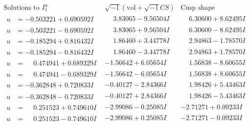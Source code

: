 \documentclass[1p]{elsarticle_modified}
\theoremstyle{definition}
\newcommand{\I}{\sqrt{-1}}
\begin{document}
$$\begin{array}{c|c|c}  
\text{Solutions to }I^u_{1}& \I (\text{vol} + \sqrt{-1}CS) & \text{Cusp shape}\\
 \hline 
\begin{aligned}
u &= -0.503221 + 0.690592 I\end{aligned}
 & \phantom{-}3.83065 - 9.56504 I & \phantom{-}6.30600 + 8.62495 I \\ \hline\begin{aligned}
u &= -0.503221 - 0.690592 I\end{aligned}
 & \phantom{-}3.83065 + 9.56504 I & \phantom{-}6.30600 - 8.62495 I \\ \hline\begin{aligned}
u &= -0.185294 + 0.816432 I\end{aligned}
 & \phantom{-}1.86460 + 3.44778 I & \phantom{-}2.94863 - 1.78570 I \\ \hline\begin{aligned}
u &= -0.185294 - 0.816432 I\end{aligned}
 & \phantom{-}1.86460 - 3.44778 I & \phantom{-}2.94863 + 1.78570 I \\ \hline\begin{aligned}
u &= \phantom{-}0.474941 + 0.689329 I\end{aligned}
 & -1.56642 + 6.05654 I & \phantom{-}1.56838 - 8.60655 I \\ \hline\begin{aligned}
u &= \phantom{-}0.474941 - 0.689329 I\end{aligned}
 & -1.56642 - 6.05654 I & \phantom{-}1.56838 + 8.60655 I \\ \hline\begin{aligned}
u &= -0.362848 + 0.720833 I\end{aligned}
 & -0.40127 - 2.84366 I & \phantom{-}1.98426 + 5.43463 I \\ \hline\begin{aligned}
u &= -0.362848 - 0.720833 I\end{aligned}
 & -0.40127 + 2.84366 I & \phantom{-}1.98426 - 5.43463 I \\ \hline\begin{aligned}
u &= \phantom{-}0.251523 + 0.749610 I\end{aligned}
 & -2.99086 - 0.25085 I & -2.71271 + 0.09233 I \\ \hline\begin{aligned}
u &= \phantom{-}0.251523 - 0.749610 I\end{aligned}
 & -2.99086 + 0.25085 I & -2.71271 - 0.09233 I \\ \hline\begin{aligned}

\end{aligned}
\end{array}$$
\end{document}
